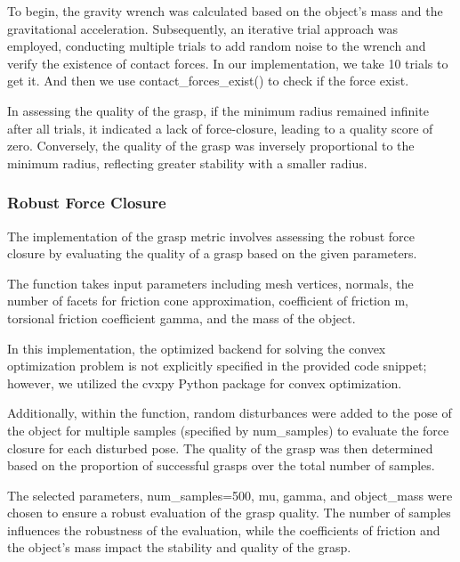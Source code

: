 \documentclass{article}
\begin{document}
\begin{multicols}{2}
\begin{itemize}
\end{itemize}

To begin, the gravity wrench was calculated based on the object's mass and the gravitational acceleration. Subsequently, an iterative trial approach was employed, conducting multiple trials to add random noise to the wrench and verify the existence of contact forces\cite{Graspqualitymeasures:}. In our implementation, we take 10 trials to get it. And then we use contact\_forces\_exist() to check if the force exist.

In assessing the quality of the grasp, if the minimum radius remained infinite after all trials, it indicated a lack of force-closure, leading to a quality score of zero. Conversely, the quality of the grasp was inversely proportional to the minimum radius, reflecting greater stability with a smaller radius.

\subsubsection{Robust Force Closure} 

The implementation of the grasp metric involves assessing the robust force closure by evaluating the quality of a grasp based on the given parameters.

 The function takes input parameters including mesh vertices, normals, the number of facets for friction cone approximation, coefficient of friction m, torsional friction coefficient gamma, and the mass of the object\cite{Graspqualitymeasures:}.

In this implementation, the optimized backend for solving the convex optimization problem is not explicitly specified in the provided code snippet; however, we utilized the cvxpy Python package for convex optimization\cite{8202167}.


Additionally, within the function, random disturbances were added to the pose of the object for multiple samples (specified by num\_samples) to evaluate the force closure for each disturbed pose. The quality of the grasp was then determined based on the proportion of successful grasps over the total number of samples.

The selected parameters, num\_samples=500, mu, gamma, and object\_mass were chosen to ensure a robust evaluation of the grasp quality. The number of samples influences the robustness of the evaluation, while the coefficients of friction and the object's mass impact the stability and quality of the grasp.





\end{multicols}
\end{document}

